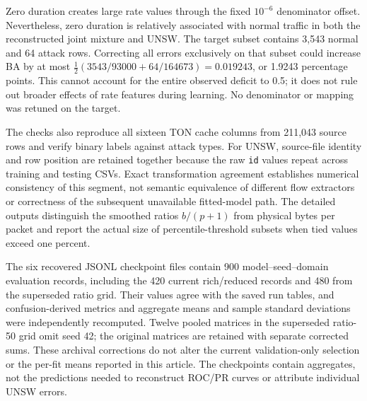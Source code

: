 Zero duration creates large rate values through the fixed $10^{-6}$ denominator offset. Nevertheless, zero duration is relatively associated with normal traffic in both the reconstructed joint mixture and UNSW. The target subset contains 3,543 normal and 64 attack rows. Correcting all errors exclusively on that subset could increase BA by at most $\tfrac12(3543/93000+64/164673)=0.019243$, or 1.9243 percentage points. This cannot account for the entire observed deficit to 0.5; it does not rule out broader effects of rate features during learning. No denominator or mapping was retuned on the target.

The checks also reproduce all sixteen TON cache columns from 211,043 source rows and verify binary labels against attack types. For UNSW, source-file identity and row position are retained together because the raw \texttt{id} values repeat across training and testing CSVs. Exact transformation agreement establishes numerical consistency of this segment, not semantic equivalence of different flow extractors or correctness of the subsequent unavailable fitted-model path. The detailed outputs distinguish the smoothed ratios $b/(p+1)$ from physical bytes per packet and report the actual size of percentile-threshold subsets when tied values exceed one percent.

The six recovered JSONL checkpoint files contain 900 model--seed--domain evaluation records, including the 420 current rich/reduced records and 480 from the superseded ratio grid. Their values agree with the saved run tables, and confusion-derived metrics and aggregate means and sample standard deviations were independently recomputed. Twelve pooled matrices in the superseded ratio-50 grid omit seed 42; the original matrices are retained with separate corrected sums. These archival corrections do not alter the current validation-only selection or the per-fit means reported in this article. The checkpoints contain aggregates, not the predictions needed to reconstruct ROC/PR curves or attribute individual UNSW errors.

